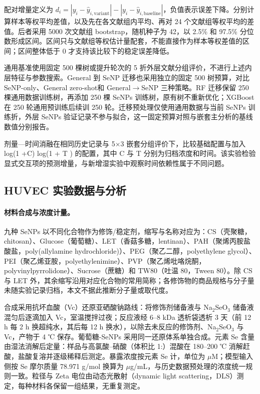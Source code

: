 配对增量定义为 $d_i=|y_i-\hat y_{i,\mathrm{variant}}|-|y_i-\hat y_{i,\mathrm{baseline}}|$，负值表示误差下降。分别计算样本等权平均差值，以及先在各文献组内平均、再对 24 个文献组等权平均的差值。后者采用 5000 次文献组 bootstrap，随机种子为 42，以 2.5\% 和 97.5\% 分位数形成区间。区间只与文献组等权估计量配套，不能直接作为样本等权差值的区间；区间整体低于 0 才支持该比较下的稳定误差降低。

通用基准使用固定 500 棵树或提升轮次的 5 折外层文献分组评价，不进行上述内层特征与参数搜索。General 到 SeNP 迁移也采用独立的固定 500 树预算，对比 SeNP-only、General zero-shot和 General\ensuremath{\rightarrow}SeNP 三种策略。RF 迁移保留 250 棵通用数据训练树，再添加 250 棵 SeNPs 训练树，原有树不重新优化；XGBoost 在 250 轮通用预训练后续训 250 轮。迁移预处理仅使用通用数据与当前 SeNPs 训练折，外层 SeNPs 验证记录不参与拟合，这一固定预算对照与嵌套主分析的基线数值分别报告。

剂量—时间消融在相同历史记录与 5\ensuremath{\times}3 嵌套分组评价下，比较基础配置与加入 log(1 +C) log(1 + T ) 的配置，其中 C 与 T 分别为归档浓度和时间。该实验检验显式交互项的预测增量，与新增湿实验中观察时间依赖性属于不同问题。

\subsection{HUVEC 实验数据与分析}

\paragraph{材料合成与浓度计量。}
九种 SeNPs 以不同化合物作为修饰/稳定剂，缩写与名称对应为：CS（壳聚糖，chitosan）、Glucose（葡萄糖）、LET（香菇多糖，lentinan）、PAH（聚烯丙胺盐酸盐，poly(allylamine hydrochloride)）、PEG（聚乙二醇，polyethylene glycol）、PEI（聚乙烯亚胺，polyethylenimine）、PVP（聚乙烯吡咯烷酮，polyvinylpyrrolidone）、Sucrose（蔗糖）和 TW80（吐温 80，Tween 80）。除 CS 与 LET 外，其余缩写沿用对应化合物的常用简称；各修饰物的商品规格与分子量未随实验记录归档，本文不据此推断分子量或取代度。

合成采用抗坏血酸（Vc）还原亚硒酸钠路线：将修饰剂储备液与 Na$_2$SeO$_3$ 储备液混匀后逐滴加入 Vc，室温搅拌过夜；反应液经 6--8 kDa 透析袋透析 3 天（前 12 h 每 2 h 换超纯水，其后每 12 h 换水），以除去未反应的修饰剂、Na$_2$SeO$_3$ 与 Vc，产物于 4 ℃ 保存。葡萄糖-SeNPs 采用同一还原体系单独合成。元素 Se 含量由湿法消解后定量：样品与高氯酸--硝酸（体积比 1\!:）混酸在 180--200 ℃ 消解赶酸，盐酸复溶并逐级稀释后测定。暴露浓度按元素 Se 计，单位为 $\mu$M；模型输入侧按 Se 摩尔质量 78.971 g/mol 换算为 $\mu$g/mL，与历史数据预处理的浓度统一规则一致。粒径与 Zeta 电位由动态光散射（dynamic light scattering，DLS）测定，每种材料各保留一组结果，无重复测定。

